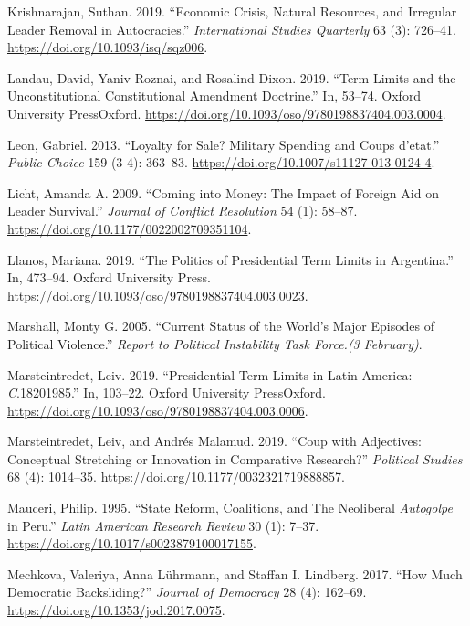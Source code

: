 \documentclass[
  12pt,
]{report}
\newlength{\cslhangindent}
\newenvironment{CSLReferences}[2] %
 {\begin{list}{}{%
  \setlength{\itemindent}{0pt}
  \setlength{\leftmargin}{0pt}
  \setlength{\parsep}{0pt}
  \ifodd #1
   \setlength{\leftmargin}{\cslhangindent}
   \setlength{\itemindent}{-1\cslhangindent}
  \fi
  \setlength{\itemsep}{#2\baselineskip}}}
 {\end{list}}
\begin{document}
\begin{CSLReferences}{1}{0}
Krishnarajan, Suthan. 2019. {``Economic Crisis, Natural Resources, and
Irregular Leader Removal in Autocracies.''} \emph{International Studies
Quarterly} 63 (3): 726--41. \url{https://doi.org/10.1093/isq/sqz006}.

Landau, David, Yaniv Roznai, and Rosalind Dixon. 2019. {``Term Limits
and the Unconstitutional Constitutional Amendment Doctrine.''} In,
53--74. Oxford University PressOxford.
\url{https://doi.org/10.1093/oso/9780198837404.003.0004}.

Leon, Gabriel. 2013. {``Loyalty for Sale? Military Spending and Coups
d{'}etat.''} \emph{Public Choice} 159 (3-4): 363--83.
\url{https://doi.org/10.1007/s11127-013-0124-4}.

Licht, Amanda A. 2009. {``Coming into Money: The Impact of Foreign Aid
on Leader Survival.''} \emph{Journal of Conflict Resolution} 54 (1):
58--87. \url{https://doi.org/10.1177/0022002709351104}.

Llanos, Mariana. 2019. {``The Politics of Presidential Term Limits in
Argentina.''} In, 473--94. Oxford University Press.
\url{https://doi.org/10.1093/oso/9780198837404.003.0023}.

Marshall, Monty G. 2005. {``Current Status of the World's Major Episodes
of Political Violence.''} \emph{Report to Political Instability Task
Force.(3 February)}.

Marsteintredet, Leiv. 2019. {``Presidential Term Limits in Latin
America: {\emph{C}}.1820{\textendash}1985.''} In, 103--22. Oxford
University PressOxford.
\url{https://doi.org/10.1093/oso/9780198837404.003.0006}.

Marsteintredet, Leiv, and Andrés Malamud. 2019. {``Coup with Adjectives:
Conceptual Stretching or Innovation in Comparative Research?''}
\emph{Political Studies} 68 (4): 1014--35.
\url{https://doi.org/10.1177/0032321719888857}.

Mauceri, Philip. 1995. {``State Reform, Coalitions, and The Neoliberal
{\emph{Autogolpe}} in Peru.''} \emph{Latin American Research Review} 30
(1): 7--37. \url{https://doi.org/10.1017/s0023879100017155}.

Mechkova, Valeriya, Anna Lührmann, and Staffan I. Lindberg. 2017. {``How
Much Democratic Backsliding?''} \emph{Journal of Democracy} 28 (4):
162--69. \url{https://doi.org/10.1353/jod.2017.0075}.


\end{CSLReferences}
\end{document}
